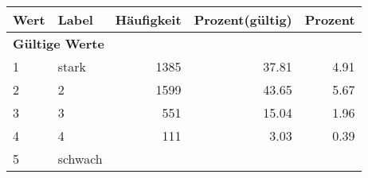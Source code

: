      \begin{longtable}{lXrrr}
     \toprule
     \textbf{Wert} & \textbf{Label} & \textbf{Häufigkeit} & \textbf{Prozent(gültig)} & \textbf{Prozent} \\
     \endhead
     \midrule
     \multicolumn{5}{l}{\textbf{Gültige Werte}}\\

     1 &
     \multicolumn{1}{X}{ stark   } &


       \num{1385} &
       \num[round-mode=places,round-precision=2]{37.81} &
         \num[round-mode=places,round-precision=2]{4.91} \\

     2 &
     \multicolumn{1}{X}{ 2   } &


       \num{1599} &
       \num[round-mode=places,round-precision=2]{43.65} &
         \num[round-mode=places,round-precision=2]{5.67} \\

     3 &
     \multicolumn{1}{X}{ 3   } &


       \num{551} &
       \num[round-mode=places,round-precision=2]{15.04} &
         \num[round-mode=places,round-precision=2]{1.96} \\

     4 &
     \multicolumn{1}{X}{ 4   } &


       \num{111} &
       \num[round-mode=places,round-precision=2]{3.03} &
         \num[round-mode=places,round-precision=2]{0.39} \\

     5 &
     \multicolumn{1}{X}{ schwach   } &



\end{longtable}
